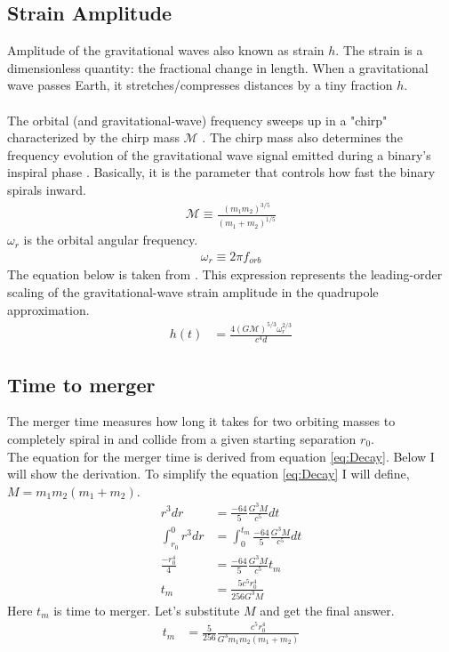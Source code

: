 \documentclass[12pt]{article}
\begin{document}
\subsection{Strain Amplitude}
Amplitude of the gravitational waves also known as strain $h$. The strain is a dimensionless quantity: the fractional change in length. When a gravitational wave passes Earth, it stretches/compresses distances by a tiny fraction $h$.\\
\\The orbital (and gravitational-wave) frequency sweeps up in a "chirp" characterized by the chirp mass $\mathcal{M}$ \cite{CreightonGW}. The chirp mass also determines the frequency evolution of the gravitational wave signal emitted during a binary's inspiral phase \cite{ChirpMassWiki}. Basically, it is the parameter that controls how fast the binary spirals inward.
    \begin{align}
        \mathcal{M} \equiv \frac{(m_1m_2)^{3/5}}{(m_1+m_2)^{1/5}}
        \label{eq:Chirp}
    \end{align}
$\omega_r$ is the orbital angular frequency.
    \begin{align}
        \omega_r \equiv 2\pi f_{orb}
        \label{eq:angular}
    \end{align}
The equation below is taken from \cite{CreightonGW}. This expression represents the leading-order scaling of the gravitational-wave strain amplitude in the quadrupole approximation.
    \begin{align}
        h(t) &= \frac{4(G\mathcal{M})^{5/3}\omega_r^{2/3}}{c^4d}
        \label{eq:strain}
    \end{align}

\subsection{Time to merger}
The merger time measures how long it takes for two orbiting masses to completely spiral in and collide from a given starting separation $r_0$.
\\The equation for the merger time is derived from equation \eqref{eq:Decay}. Below I will show the derivation.
To simplify the equation \eqref{eq:Decay} I will define, $M = m_1m_2(m_1+m_2)$. \\
\begin{align}
     r^{3} dr &= \frac{-64}{5} \frac{G^3M}{c^5} dt\\
     \int_{r_0}^{0} r^{3} dr &= \int_0^{t_m}\frac{-64}{5} \frac{G^3M}{c^5} dt \\
     \frac{-r_0^4}{4} &= \frac{-64}{5} \frac{G^3M}{c^5} t_m \\
     t_m &=\frac{5c^5r_0^4}{256G^3M}
\end{align}
Here $t_m$ is time to merger. Let's substitute $M$ and get the final answer.
\begin{align}
    t_m &= \frac{5}{256}\frac{c^5r_0^4}{G^3m_1m_2(m_1+m_2)}
    \label{eq:merger}
\end{align}
\end{document}

